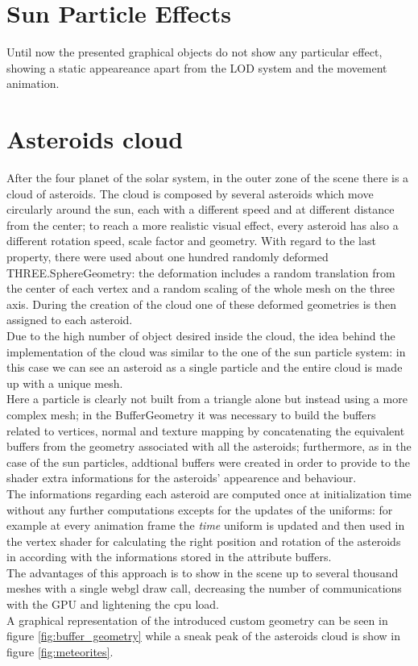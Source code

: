\documentclass[paper=a4, fontsize=11pt]{scrartcl} %
\numberwithin{equation}{section} %
\numberwithin{figure}{section} %
\numberwithin{table}{section} %
\theoremstyle{definition}
\begin{document}

\section{Sun Particle Effects}
Until now the presented graphical objects do not show any particular effect, showing a static appeareance apart from the LOD system and the movement animation. 


\section{Asteroids cloud}

After the four planet of the solar system, in the outer zone of the scene there is a cloud of asteroids. The cloud is composed by several asteroids which move circularly around the sun, each with a different speed and at different distance from the center; to reach a more realistic visual effect, every asteroid has also a different rotation speed, scale factor and geometry. With regard to the last property, there were used about one hundred randomly deformed THREE.SphereGeometry: the deformation includes a random translation from the center of each vertex and a random scaling of the whole mesh on the three axis. During the creation of the cloud one of these deformed geometries is then assigned to each asteroid.\\
Due to the high number of object desired inside the cloud, the idea behind the implementation of the cloud was similar to the one of the sun particle system: in this case we can see an asteroid as a single particle and the entire cloud is made up with a unique mesh.\\
Here a particle is clearly not built from a triangle alone but instead using a more complex mesh; in the BufferGeometry it was necessary to build the buffers related to vertices, normal and texture mapping by concatenating the equivalent buffers from the geometry associated with all the asteroids; furthermore, as in the case of the sun particles, addtional buffers were created in order to provide to the shader extra informations for the asteroids' appearence and behaviour.\\
The informations regarding each asteroid are computed once at initialization time without any further computations excepts for the updates of the uniforms: for example at every animation frame the \textit{time} uniform is updated and then used in the vertex shader for calculating the right position and rotation of the asteroids in according with the informations stored in the attribute buffers.\\
The advantages of this approach is to show in the scene up to several thousand meshes with a single webgl draw call, decreasing the number of communications with the GPU and lightening the cpu load.\\
A graphical representation of the introduced custom geometry can be seen in figure \ref{fig:buffer_geometry} while a sneak peak of the asteroids cloud is show in figure \ref{fig:meteorites}.
\end{document}
